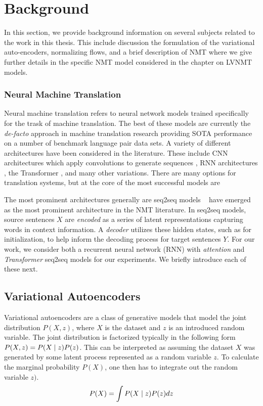 \chapter{Background}

In this section, we provide background information on several subjects related to the work in this thesis. This include discussion the formulation of the variational auto-encoders, normalizing flows, and a brief description of \ac{NMT} where we give further details in the specific NMT model considered in the chapter on \ac{LVNMT} models.  


\subsection{Neural Machine Translation}

Neural machine translation refers to neural network models trained specifically for the trask of machine translation. The best of these models are currently the \textit{de-facto} approach in machine translation research providing \ac{SOTA} performance on a number of benchmark language pair data sets.
 A variety of different architectures have been considered in the literature. These include CNN architectures which apply convolutions to generate sequences , \ac{RNN} architectures \cite{bahdanau2014NMTBYJoint,cho2014GRU}, the Transformer , and many other variations. There are many options for translation systems, but at the core of the most successful models are 

The most prominent architectures generally are \ac{seq2seq} models ~\cite{koehn2017NMT} have emerged as the most prominent architecture in the NMT literature. In seq2seq models, source sentences $X$ are \textit{encoded} as a series of latent representations capturing words in context information. A \textit{decoder} utilizes these hidden states, such as for initialization, to help inform the decoding process for target sentences $Y$. For our work, we consider both a recurrent neural network (RNN) with \textit{attention} and \textit{Transformer} seq2seq models for our experiments. We briefly introduce each of these next.

\section{Variational Autoencoders}

Variational autoencoders are a class of generative models that model the joint distribution $P(X, z)$, where $X$ is the dataset and $z$ is an introduced random variable. The joint distribution is factorized typically in the following form $P(X, z) = P(X\; | \;{z})P(z)$. This can be interpreted as assuming the dataset $X$ was generated by some latent process represented as a random variable $z$. To calculate the marginal probability $P(X)$, one then has to integrate out the random variable $z)$.
\begin{equation}
	P(X) = \int P(X \; | \;{z}) P(z) dz
\end{equation}

